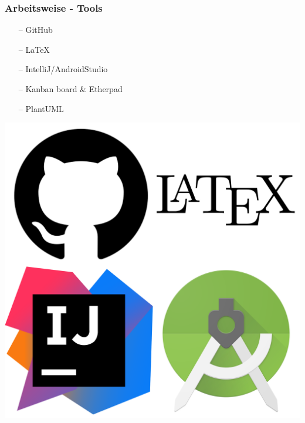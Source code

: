 \documentclass[aspectratio=1610]{beamer}
\begin{document}
  \begin{frame}[plain]
      \frametitle{\textbf{Arbeitsweise} - Tools}
      \begin{minipage}{0.45\textwidth}
        \begin{itemize}
          \item[--] GitHub
          \item[--] LaTeX
          \item[--] IntelliJ/AndroidStudio
          \item[--] Kanban board \& Etherpad
          \item[--] PlantUML
        \end{itemize}
      \end{minipage}
      \begin{minipage}{0.45\textwidth}
        \includegraphics[width = \columnwidth - 30pt]
          {images/tools.png}
      \end{minipage}
  \end{frame}
\end{document}
